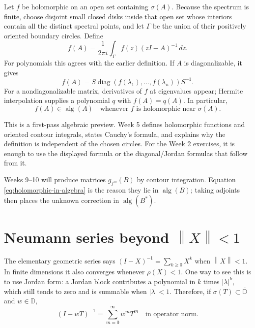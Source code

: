 \documentclass[11pt,oneside,openany]{book}
\theoremstyle{definition}
\theoremstyle{remark}
\newcommand{\D}{\mathbb D}
\newcommand{\alg}{\operatorname{alg}}
\newcommand{\diag}{\operatorname{diag}}
\newcommand{\spec}{\sigma}
\newcommand{\norm}[1]{\left\lVert #1\right\rVert}
\newcommand{\olD}{\overline{\D}}
\begin{document}
Let \(f\) be holomorphic on an open set containing \(\spec(A)\).
Because the spectrum is finite, choose disjoint small closed disks
inside that open set whose interiors contain all the distinct spectral
points, and let \(\Gamma\) be the union of their positively oriented
boundary circles.  Define
\begin{equation}
  f(A)=\frac{1}{2\pi i}\int_\Gamma
  f(z)(zI-A)^{-1}\,dz.
  \label{eq:cauchy-functional-calculus}
\end{equation}
For polynomials this agrees with the earlier definition.  If \(A\) is
diagonalizable, it gives
\[
  f(A)=S\diag(f(\lambda_1),\ldots,f(\lambda_n))S^{-1}.
\]
For a nondiagonalizable matrix, derivatives of \(f\) at eigenvalues
appear; Hermite interpolation supplies a polynomial \(q\) with
\(f(A)=q(A)\).  In particular,
\begin{equation}
  f(A)\in\alg(A)
  \quad\text{whenever \(f\) is holomorphic near \(\spec(A)\).}
  \label{eq:holomorphic-in-algebra}
\end{equation}

This is a first-pass algebraic preview.  Week 5 defines holomorphic
functions and oriented contour integrals, states Cauchy's formula, and
explains why the definition is independent of the chosen circles.
For the Week 2 exercises, it is enough to use the displayed formula or
the diagonal/Jordan formulas that follow from it.

\begin{checkpoint}
Weeks 9--10 will produce matrices \(g_{f^m}(B)\) by contour
integration.  Equation \eqref{eq:holomorphic-in-algebra} is the reason
they lie in \(\alg(B)\); taking adjoints then places the unknown
correction in \(\alg(B^*)\).
\end{checkpoint}

\section{Neumann series beyond
\texorpdfstring{\(\norm{X}<1\)}{norm X less than 1}}

The elementary geometric series says
\((I-X)^{-1}=\sum_{k\geq0}X^k\) when \(\norm{X}<1\).  In finite
dimensions it also converges whenever \(\rho(X)<1\).  One way to see
this is to use Jordan form: a Jordan block contributes a polynomial in
\(k\) times \(|\lambda|^k\), which still tends to zero and is summable
when \(|\lambda|<1\).  Therefore, if
\(\spec(T)\subset\olD\) and \(w\in\D\),
\begin{equation}
  (I-wT)^{-1}=\sum_{m=0}^{\infty}w^mT^m
  \quad\text{in operator norm}.
  \label{eq:neumann-resolvent}
\end{equation}
\end{document}
